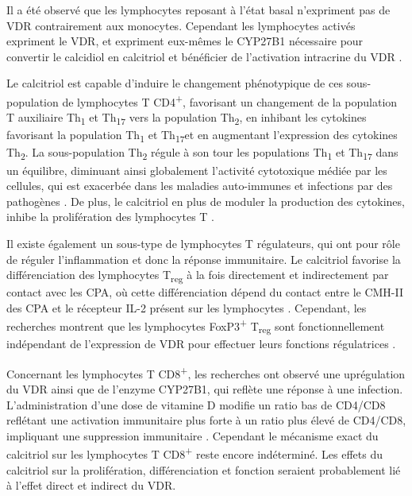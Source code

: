 \documentclass[
  a4paper,
  DIV=11,
  numbers=noendperiod,
  listof=totoc]{scrreprt}
\begin{document}
Il a été observé que les lymphocytes reposant à l'état basal n'expriment
pas de \ac{VDR} contrairement aux monocytes. Cependant les lymphocytes
activés expriment le \ac{VDR}, et expriment eux-mêmes le CYP27B1
nécessaire pour convertir le calcidiol en calcitriol et bénéficier de
l'activation intracrine du \ac{VDR} \autocite{Charoenngam.2020}.

Le calcitriol est capable d'induire le changement phénotypique de ces
sous-population de lymphocytes T CD4\textsuperscript{+}, favorisant un
changement de la population T auxiliaire Th\textsubscript{1} et
Th\textsubscript{17} vers la population Th\textsubscript{2}, en inhibant
les cytokines favorisant la population Th\textsubscript{1} et
Th\textsubscript{17}et en augmentant l'expression des cytokines
Th\textsubscript{2}. La sous-population Th\textsubscript{2} régule à son
tour les populations Th\textsubscript{1} et Th\textsubscript{17} dans un
équilibre, diminuant ainsi globalement l'activité cytotoxique médiée par
les cellules, qui est exacerbée dans les maladies auto-immunes et
infections par des pathogènes \autocite{Meza-Meza.2022}. De plus, le
calcitriol en plus de moduler la production des cytokines, inhibe la
prolifération des lymphocytes T \autocite{Cantorna.2015}.

Il existe également un sous-type de lymphocytes T régulateurs, qui ont
pour rôle de réguler l'inflammation et donc la réponse immunitaire. Le
calcitriol favorise la différenciation des lymphocytes
T\textsubscript{reg} à la fois directement et indirectement par contact
avec les \ac{CPA}, où cette différenciation dépend du contact entre le
\ac{CMH-II} des \ac{CPA} et le récepteur \ac{IL-2} présent sur les
lymphocytes \autocite{Charoenngam.2020}. Cependant, les recherches
montrent que les lymphocytes FoxP3\textsuperscript{+}
T\textsubscript{reg} sont fonctionnellement indépendant de l'expression
de VDR pour effectuer leurs fonctions régulatrices
\autocite{Cantorna.2010}.

Concernant les lymphocytes T CD8\textsuperscript{+}, les recherches ont
observé une uprégulation du VDR ainsi que de l'enzyme CYP27B1, qui
reflète une réponse à une infection. L'administration d'une dose de
vitamine D modifie un ratio bas de CD4/CD8 reflétant une activation
immunitaire plus forte à un ratio plus élevé de CD4/CD8, impliquant une
suppression immunitaire \autocite{Meza-Meza.2022}. Cependant le
mécanisme exact du calcitriol sur les lymphocytes T
CD8\textsuperscript{+} reste encore indéterminé. Les effets du
calcitriol sur la prolifération, différenciation et fonction seraient
probablement lié à l'effet direct et indirect du VDR.
\end{document}
